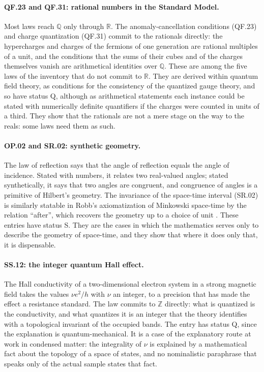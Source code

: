 \documentclass{situationist-preprint}
\begin{document}
\paragraph{QF.23 and QF.31: rational numbers in the Standard Model.} Most laws reach $\mathbb Q$ only through $\mathbb R$. The anomaly-cancellation conditions (QF.23) and charge quantization (QF.31) commit to the rationals directly: the hypercharges and charges of the fermions of one generation are rational multiples of a unit, and the conditions that the sums of their cubes and of the charges themselves vanish are arithmetical identities over $\mathbb Q$. These are among the five laws of the inventory that do not commit to $\mathbb R$. They are derived within quantum field theory, as conditions for the consistency of the quantized gauge theory, and so have status Q, although as arithmetical statements each instance could be stated with numerically definite quantifiers if the charges were counted in units of a third. They show that the rationals are not a mere stage on the way to the reals: some laws need them as such.

\paragraph{OP.02 and SR.02: synthetic geometry.} The law of reflection says that the angle of reflection equals the angle of incidence. Stated with numbers, it relates two real-valued angles; stated synthetically, it says that two angles are congruent, and congruence of angles is a primitive of Hilbert's geometry. The invariance of the space-time interval (SR.02) is similarly statable in Robb's axiomatization of Minkowski space-time by the relation \enquote{after}, which recovers the geometry up to a choice of unit \citep{Robb1914}. These entries have status S. They are the cases in which the mathematics serves only to describe the geometry of space-time, and they show that where it does only that, it is dispensable.

\paragraph{SS.12: the integer quantum Hall effect.} The Hall conductivity of a two-dimensional electron system in a strong magnetic field takes the values $\nu e^2/h$ with $\nu$ an integer, to a precision that has made the effect a resistance standard. The law commits to $\mathbb Z$ directly: what is quantized is the conductivity, and what quantizes it is an integer that the theory identifies with a topological invariant of the occupied bands. The entry has status Q, since the explanation is quantum-mechanical. It is a case of the explanatory route at work in condensed matter: the integrality of $\nu$ is explained by a mathematical fact about the topology of a space of states, and no nominalistic paraphrase that speaks only of the actual sample states that fact.
\end{document}
